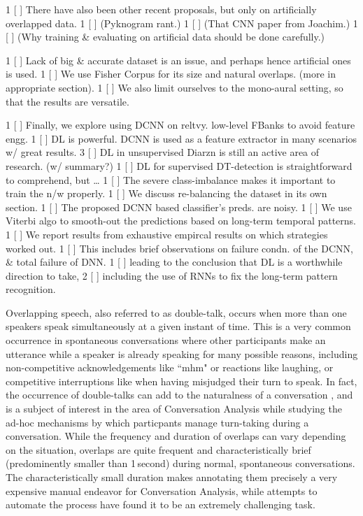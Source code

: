 \documentclass[a4paper]{article}
\begin{document}
{       1 [ ] There have also been other recent proposals, but only on artificially overlapped data.
       1 [ ] (Pyknogram rant.)
       1 [ ] (That CNN paper from Joachim.)
       1 [ ] (Why training & evaluating on artificial data should be done carefully.)

       1 [ ] Lack of big & accurate dataset is an issue, and perhaps hence artificial ones is used.
       1 [ ] We use Fisher Corpus for its size and natural overlaps. (more in appropriate section).
       1 [ ] We also limit ourselves to the mono-aural setting, so that the results are versatile.

       1 [ ] Finally, we explore using DCNN on reltvy. low-level FBanks to avoid feature engg.
       1 [ ] DL is powerful. DCNN is used as a feature extractor in many scenarios w/ great results.
       3 [ ] DL in unsupervised Diarzn is still an active area of research. (w/ summary?)
       1 [ ] DL for supervised DT-detection is straightforward to comprehend, but \ldots
       1 [ ] The severe class-imbalance makes it important to train the n/w properly.
       1 [ ] We discuss re-balancing the dataset in its own section.
       1 [ ] The proposed DCNN based classifier's preds. are noisy.
       1 [ ] We use Viterbi algo to smooth-out the predictions based on long-term temporal patterns.
       1 [ ] We report results from exhaustive empircal results on which strategies worked out.
       1 [ ] This includes brief observations on failure condn. of the DCNN, & total failure of DNN.
       1 [ ] leading to the conclusion that DL is a worthwhile direction to take,
       2 [ ] including the use of RNNs to fix the long-term pattern recognition.
}


Overlapping speech, also referred to as double-talk,
occurs when more than one speakers speak simultaneously at a given instant of time.
This is a very common occurrence in spontaneous conversations where other participants make an utterance while a speaker is already speaking for many possible reasons,
including non-competitive acknowledgements like “mhm" or reactions like laughing,
or competitive interruptions like when having misjudged their turn to speak.
In fact, the occurrence of double-talks can add to the naturalness of a conversation \cite{shriberg_spontaneous_2005,NenkovaHighFrequencyWord2008},
and is a subject of interest in the area of Conversation Analysis while studying the ad-hoc mechanisms by which particpants manage turn-taking during a conversation.
While the frequency and duration of overlaps can vary depending on the situation,
overlaps are quite frequent and characteristically brief (predominently smaller than 1\,second)
during normal, spontaneous conversations.  %
The characteristically small duration makes annotating them precisely a very expensive manual endeavor for Conversation Analysis,
while attempts to automate the process have found it to be an extremely challenging task.
\end{document}
